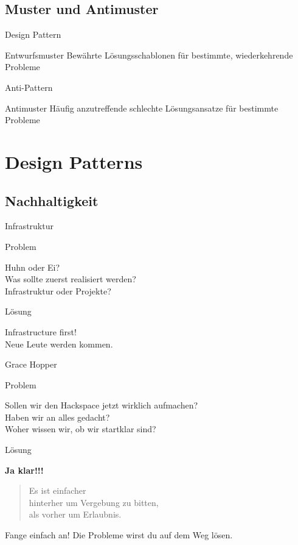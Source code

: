 \documentclass[aspectratio=43]{beamer}
\newcommand{\concept}[2]{
  \begin{block}{#1}
    \pause
    #2
  \end{block}
}
\newcommand{\pattern}[2]{
  \begin{alertblock}{Problem}
    #1
  \end{alertblock}
  \pause
  \begin{exampleblock}{Lösung}
    #2
  \end{exampleblock}
}
\begin{document}
  \subsection{Muster und Antimuster}

  \begin{frame}{Design Pattern}
    \concept{Entwurfsmuster}{Bewährte Lösungsschablonen für bestimmte, wiederkehrende Probleme}
  \end{frame}

  \begin{frame}{Anti-Pattern}
    \concept{Antimuster}{Häufig anzutreffende schlechte Lösungsansatze für bestimmte Probleme}
  \end{frame}

  \section{Design Patterns}

  \subsection{Nachhaltigkeit}

  \begin{frame}{Infrastruktur}
    \pattern{
      Huhn oder Ei?\\
      Was sollte zuerst realisiert werden?\\
      Infrastruktur oder Projekte?
    }{
      Infrastructure first!\\
      Neue Leute werden kommen.
    }
  \end{frame}

  \begin{frame}{Grace Hopper}
    \pattern{
      Sollen wir den Hackspace jetzt wirklich aufmachen?\\
      Haben wir an alles gedacht?\\
      Woher wissen wir, ob wir startklar sind?
    }{
      \textbf{Ja klar!!!}
      \pause
      \begin{quote}
        Es ist einfacher\\
        hinterher um Vergebung zu bitten,\\
        als vorher um Erlaubnis.
      \end{quote}
      \pause
      Fange einfach an!
      Die Probleme wirst du auf dem Weg lösen.
    }
  \end{frame}
\end{document}
